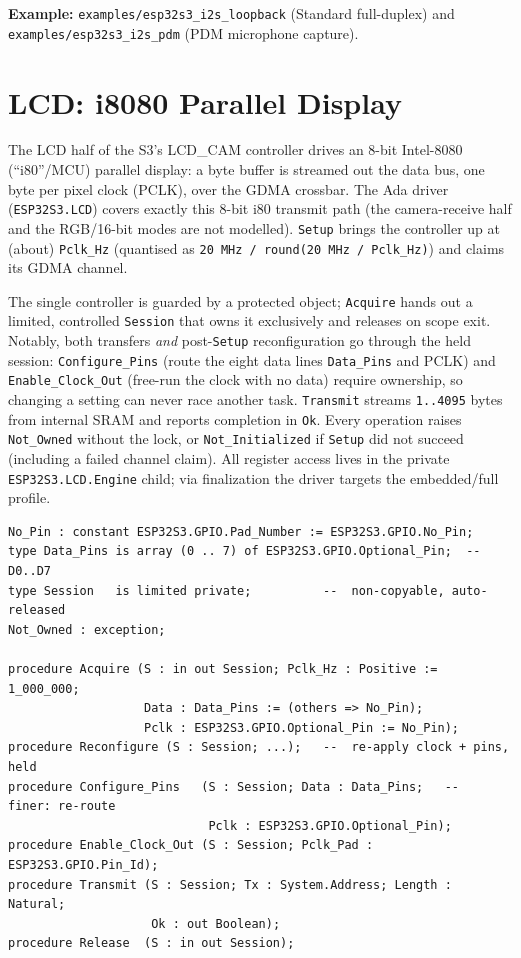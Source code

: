 \noindent\textbf{Example:} \texttt{examples/esp32s3\_i2s\_loopback} (Standard
full-duplex) and \texttt{examples/esp32s3\_i2s\_pdm} (PDM microphone capture).

\section{LCD: i8080 Parallel Display}
\label{app:int:lcd}

The LCD half of the S3's LCD\_CAM controller drives an 8-bit Intel-8080
(``i80''/MCU) parallel display: a byte buffer is streamed out the data bus, one
byte per pixel clock (PCLK), over the GDMA crossbar. The Ada driver
(\texttt{ESP32S3.LCD}) covers exactly this 8-bit i80 transmit path (the
camera-receive half and the RGB/16-bit modes are not modelled). \texttt{Setup}
brings the controller up at (about) \texttt{Pclk\_Hz} (quantised as
\texttt{20\,MHz / round(20\,MHz / Pclk\_Hz)}) and claims its GDMA channel.

The single controller is guarded by a protected object; \texttt{Acquire} hands out
a limited, controlled \texttt{Session} that owns it exclusively and releases on
scope exit. Notably, both transfers \emph{and} post-\texttt{Setup} reconfiguration
go through the held session: \texttt{Configure\_Pins} (route the eight data lines
\texttt{Data\_Pins} and PCLK) and \texttt{Enable\_Clock\_Out} (free-run the clock
with no data) require ownership, so changing a setting can never race another
task. \texttt{Transmit} streams \texttt{1..4095} bytes from internal SRAM and
reports completion in \texttt{Ok}. Every operation raises \texttt{Not\_Owned}
without the lock, or \texttt{Not\_Initialized} if \texttt{Setup} did not succeed
(including a failed channel claim). All register access lives in the private
\texttt{ESP32S3.LCD.Engine} child; via finalization the driver targets the
embedded/full profile.

\begin{lstlisting}
No_Pin : constant ESP32S3.GPIO.Pad_Number := ESP32S3.GPIO.No_Pin;
type Data_Pins is array (0 .. 7) of ESP32S3.GPIO.Optional_Pin;  -- D0..D7
type Session   is limited private;          --  non-copyable, auto-released
Not_Owned : exception;

procedure Acquire (S : in out Session; Pclk_Hz : Positive := 1_000_000;
                   Data : Data_Pins := (others => No_Pin);
                   Pclk : ESP32S3.GPIO.Optional_Pin := No_Pin);
procedure Reconfigure (S : Session; ...);   --  re-apply clock + pins, held
procedure Configure_Pins   (S : Session; Data : Data_Pins;   --  finer: re-route
                            Pclk : ESP32S3.GPIO.Optional_Pin);
procedure Enable_Clock_Out (S : Session; Pclk_Pad : ESP32S3.GPIO.Pin_Id);
procedure Transmit (S : Session; Tx : System.Address; Length : Natural;
                    Ok : out Boolean);
procedure Release  (S : in out Session);
\end{lstlisting}

